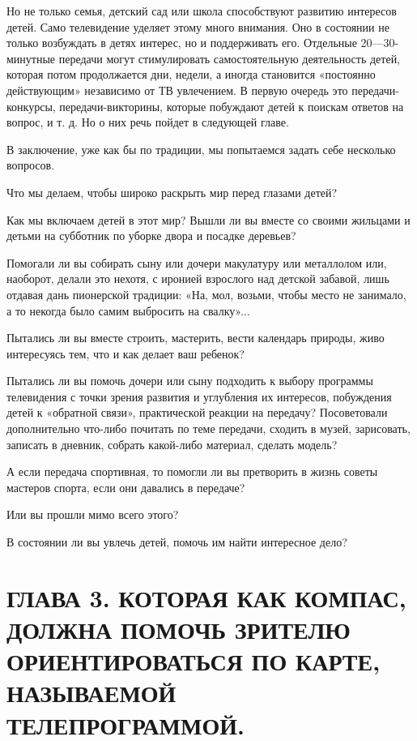 \documentclass[12pt, a4paper, openany]{book}
\begin{document}
Но не только семья, детский сад или школа способствуют развитию интересов детей. Само телевидение уделяет этому много внимания. Оно в состоянии не только возбуждать в детях интерес, но и поддерживать его. Отдельные 20—30-минутные передачи могут стимулировать самостоятельную деятельность детей, которая потом продолжается дни, недели, а иногда становится «постоянно действующим» независимо от ТВ увлечением. В первую очередь это передачи-конкурсы, передачи-викторины, которые побуждают детей к поискам ответов на вопрос, и т. д. Но о них речь пойдет в следующей главе. 

В заключение, уже как бы по традиции, мы попытаемся задать себе несколько вопросов. 

Что мы делаем, чтобы широко раскрыть мир перед глазами детей? 

Как мы включаем детей в этот мир? Вышли ли вы вместе со своими жильцами и детьми на субботник по уборке двора и посадке деревьев? 

Помогали ли вы собирать сыну или дочери макулатуру или металлолом или, наоборот, делали это нехотя, с иронией взрослого над детской забавой, лишь отдавая дань пионерской традиции: «На, мол, возьми, чтобы место не занимало, а то некогда было самим выбросить на свалку»... 

Пытались ли вы вместе строить, мастерить, вести календарь природы, живо интересуясь тем, что и как делает ваш ребенок?

Пытались ли вы помочь дочери или сыну подходить к выбору программы телевидения с точки зрения развития и углубления их интересов, побуждения детей к «обратной связи», практической реакции на передачу? Посоветовали дополнительно что-либо почитать по теме передачи, сходить в музей, зарисовать, записать в дневник, собрать какой-либо материал, сделать модель? 

А если передача спортивная, то помогли ли вы претворить в жизнь советы мастеров спорта, если они давались в передаче? 

Или вы прошли мимо всего этого? 

В состоянии ли вы увлечь детей, помочь им найти интересное дело? 

\newpage

\section[Глава третья. Которая как компас, должна помочь зрителю ориентироваться по карте, называемой телепрограммой]{\center \textbf{ГЛАВА 3. КОТОРАЯ КАК КОМПАС, ДОЛЖНА ПОМОЧЬ ЗРИТЕЛЮ ОРИЕНТИРОВАТЬСЯ ПО КАРТЕ, НАЗЫВАЕМОЙ ТЕЛЕПРОГРАММОЙ.}}
\end{document}
